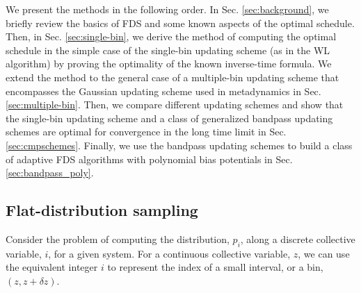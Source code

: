 \documentclass[reprint, superscriptaddress, floatfix]{revtex4-1}
\begin{document}
We present the methods
in the following order.
%
In Sec. \ref{sec:background},
we briefly review the basics of FDS
and some known aspects of the optimal schedule.
%
Then, in Sec. \ref{sec:single-bin},
we derive the method of
computing the optimal schedule
in the simple case of the
single-bin updating scheme
(as in the WL algorithm)
by proving the optimality
of the known inverse-time formula.
%
We extend the method to the general case
of a multiple-bin updating scheme
that encompasses the Gaussian updating scheme used in metadynamics
in Sec. \ref{sec:multiple-bin}.
%
Then, we compare different updating schemes
and show that the single-bin updating scheme
and a class of generalized bandpass updating schemes
are optimal for convergence
in the long time limit
in Sec. \ref{sec:cmpschemes}.
%
Finally,
we use the bandpass updating schemes
to build a class of adaptive FDS algorithms
with polynomial bias potentials
in Sec. \ref{sec:bandpass_poly}.



\subsection{\label{sec:background}
Flat-distribution sampling}






Consider the problem of computing
the distribution, $p_i$,
along a discrete collective variable, $i$,
for a given system.
%
%
For a continuous collective variable, $z$,
we can use the equivalent integer $i$ to represent
the index of a small interval, or a bin,
$(z, z + \delta z)$.
%
\end{document}
